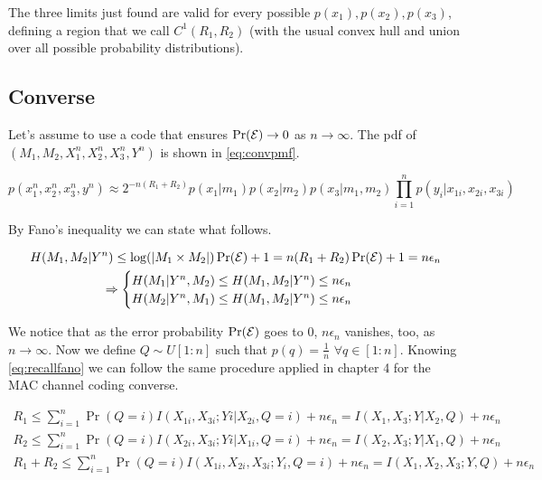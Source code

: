 The three limits just found are valid for every possible $p(x_1),p(x_2),p(x_3)$, defining a region that we call $C^1(R_1,R_2)$ (with the usual convex hull and union over all possible probability distributions).

\subsection{Converse}

Let's assume to use a code that ensures $\Pr(\mathcal{E}) \rightarrow 0$ as $n \rightarrow \infty$. The pdf of  $(M_1,M_2,X_1^n,X_2^n,X_3^n,Y^n)$ is shown in \eqref{eq:convpmf}.

\begin{equation}
	p(x_1^n,x_2^n,x_3^n,y^n)\approx2^{-n(R_1+R_2)}p(x_1|m_1)p(x_2|m_2)p(x_3|m_1,m_2)\prod_{i=1}^n p(y_i|x_{1i},x_{2i},x_{3i})
	\label{eq:convpmf}
\end{equation}

By Fano's inequality we can state what follows.

\begin{equation}
	\begin{gathered}
		H(M_1,M_2|Y^n) \leq \log(|M_1\times M_2|)\Pr(\mathcal{E})+1 = n(R_1+R_2)\Pr(\mathcal{E})+1 = n\epsilon_n\\
		\Rightarrow
		\begin{cases}
			H(M_1|Y^n,M_2) \leq H(M_1,M_2|Y^n) \leq n\epsilon_n \\
			H(M_2|Y^n,M_1) \leq H(M_1,M_2|Y^n) \leq n\epsilon_n
		\end{cases}
	\end{gathered}
	\label{eq:recallfano}
\end{equation}

We notice that as the error probability $\Pr(\mathcal{E})$ goes to 0, $n\epsilon_n$ vanishes, too, as $n \rightarrow \infty$. Now we define $Q \sim U[1:n]$ such that $p(q)=\frac{1}{n}$ $\forall q \in [1:n]$. Knowing \eqref{eq:recallfano} we can follow the same procedure applied in chapter 4 for the MAC channel coding converse.

\begin{equation}
	\begin{gathered}
		R_1 \leq \sum_{i=1}^n \Pr(Q=i) I(X_{1i},X_{3i};Yi|X_{2i},Q=i) + n\epsilon_n = I(X_{1},X_{3};Y|X_{2},Q)+n\epsilon_n\\
		R_2 \leq \sum_{i=1}^n \Pr(Q=i) I(X_{2i},X_{3i};Yi|X_{1i}, Q=i) + n\epsilon_n = I(X_{2},X_{3};Y|X_{1},Q)+n\epsilon_n\\
		R_1 + R_2 \leq \sum_{i=1}^n \Pr(Q=i)I(X_{1i},X_{2i},X_{3i};Y_i, Q=i) + n\epsilon_n = I(X_{1},X_{2},X_{3};Y,Q)+n\epsilon_n \\
	\end{gathered}
\end{equation}

